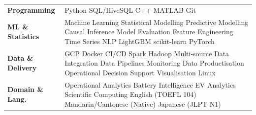 \documentclass[a4paper,9pt]{article}
\begin{document}
\begin{tabular}{@{}p{3.0cm}p{12.5cm}@{}}
\textbf{Programming} & Python \textperiodcentered{} SQL/HiveSQL \textperiodcentered{} C++ \textperiodcentered{} MATLAB \textperiodcentered{} Git \\[1pt]
\textbf{ML \& Statistics} & Machine Learning \textperiodcentered{} Statistical Modelling \textperiodcentered{} Predictive Modelling \textperiodcentered{} Causal Inference \textperiodcentered{} Model Evaluation \textperiodcentered{} Feature Engineering \textperiodcentered{} Time Series \textperiodcentered{} NLP \textperiodcentered{} LightGBM \textperiodcentered{} scikit-learn \textperiodcentered{} PyTorch \\[1pt]
\textbf{Data \& Delivery} & GCP \textperiodcentered{} Docker \textperiodcentered{} CI/CD \textperiodcentered{} Spark \textperiodcentered{} Hadoop \textperiodcentered{} Multi-source Data Integration \textperiodcentered{} Data Pipelines \textperiodcentered{} Monitoring \textperiodcentered{} Data Productisation \textperiodcentered{} Operational Decision Support \textperiodcentered{} Visualisation \textperiodcentered{} Linux \\[1pt]
\textbf{Domain \& Lang.} & Operational Analytics \textperiodcentered{} Battery Intelligence \textperiodcentered{} EV Analytics \textperiodcentered{} Scientific Computing \textperiodcentered{} English (TOEFL 104) \textperiodcentered{} Mandarin/Cantonese (Native) \textperiodcentered{} Japanese (JLPT N1) \\
\end{tabular}
\end{document}
